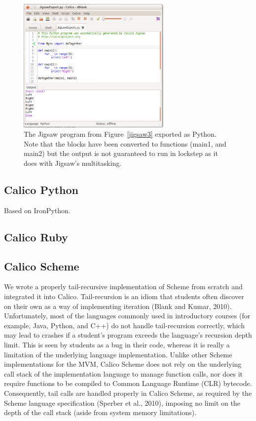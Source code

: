 \documentclass[preprint]{sigplanconf}
\begin{document}
\begin{figure}[h!]
  \centering
    \includegraphics[width=75mm]{jigsaw4.eps} 
  \caption{The Jigsaw program from Figure~\ref{jigsaw3} exported
    as Python. Note that the blocks have been converted to functions
    (main1, and main2) but the output is not guaranteed to run in
    lockstep as it does with Jigsaw's multitasking.}
  \label{jigsaw4}
\end{figure}

\subsection{Calico Python}

Based on IronPython. 

\subsection{Calico Ruby}

\subsection{Calico Scheme}

We wrote a properly tail-recursive implementation of Scheme from
scratch and integrated it into Calico.  Tail-recursion is an idiom that
students often discover on their own as a way of implementing
iteration (Blank and Kumar, 2010). Unfortunately, most of the
languages commonly used in introductory courses (for example, Java,
Python, and C++) do not handle tail-recursion correctly, which may
lead to crashes if a student’s program exceeds the language’s
recursion depth limit. This is seen by students as a bug in their
code, whereas it is really a limitation of the underlying language
implementation. Unlike other Scheme implementations for the MVM,
Calico Scheme does not rely on the underlying call stack of the
implementation language to manage function calls, nor does it require
functions to be compiled to Common Language Runtime (CLR)
bytecode. Consequently, tail calls are handled properly in Calico
Scheme, as required by the Scheme language specification (Sperber et
al., 2010), imposing no limit on the depth of the call stack (aside
from system memory limitations).
\end{document}
